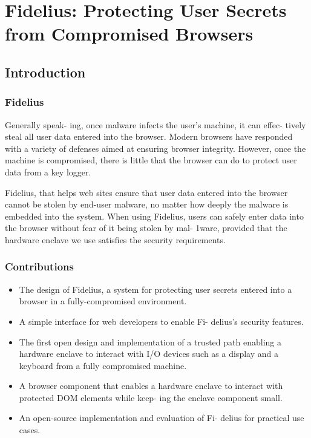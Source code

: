 \documentclass{article}
\begin{document}
\section{Fidelius: Protecting User Secrets from Compromised Browsers}

\subsection{Introduction}

\subsubsection{Fidelius}

Generally speak-
ing, once malware infects the user’s machine, it can effec-
tively steal all user data entered into the browser. Modern
browsers have responded with a variety of defenses aimed
at ensuring browser integrity. However, once the machine
is compromised, there is little that the browser can do to
protect user data from a key logger.

Fidelius, that helps web sites ensure that user data entered
into the browser cannot be stolen by end-user malware,
no matter how deeply the malware is embedded into the
system. When using Fidelius, users can safely enter data
into the browser without fear of it being stolen by mal-
1ware, provided that the hardware enclave we use satisfies
the security requirements.

\subsubsection{Contributions}

\begin{itemize}
\item The design of Fidelius, a system for protecting user
secrets entered into a browser in a fully-compromised
environment.
\item A simple interface for web developers to enable Fi-
delius’s security features.
\item The first open design and implementation of a trusted
path enabling a hardware enclave to interact with I/O
devices such as a display and a keyboard from a fully
compromised machine.
\item A browser component that enables a hardware enclave
to interact with protected DOM elements while keep-
ing the enclave component small.
\item An open-source implementation and evaluation of Fi-
delius for practical use cases.
\end{itemize}
\end{document}
